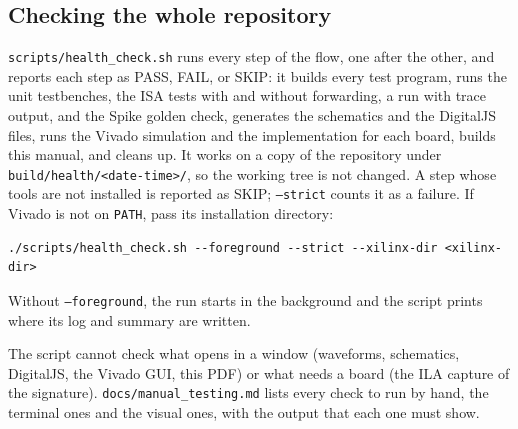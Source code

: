 \subsection{Checking the whole repository}
\label{sec:health-check}
\texttt{scripts/health\_check.sh} runs every step of the flow, one after the
other, and reports each step as PASS, FAIL, or SKIP: it builds every test
program, runs the unit testbenches, the ISA tests with and without forwarding,
a run with trace output, and the Spike golden check, generates the schematics and the
DigitalJS files, runs the Vivado simulation and the implementation for each
board, builds this manual, and cleans up. It works on a copy of the repository
under \texttt{build/health/<date-time>/}, so the working tree is not changed.
A step whose tools are not installed is reported as SKIP; \texttt{--strict}
counts it as a failure. If Vivado is not on \texttt{PATH}, pass its
installation directory:
\begin{lstlisting}[style=minrv]
./scripts/health_check.sh --foreground --strict --xilinx-dir <xilinx-dir>
\end{lstlisting}
Without \texttt{--foreground}, the run starts in the background and the script
prints where its log and summary are written.

The script cannot check what opens in a window (waveforms, schematics,
DigitalJS, the Vivado GUI, this PDF) or what needs a board (the ILA capture of
the signature). \texttt{docs/manual\_testing.md} lists every check to run by
hand, the terminal ones and the visual ones, with the output that each one must
show.

